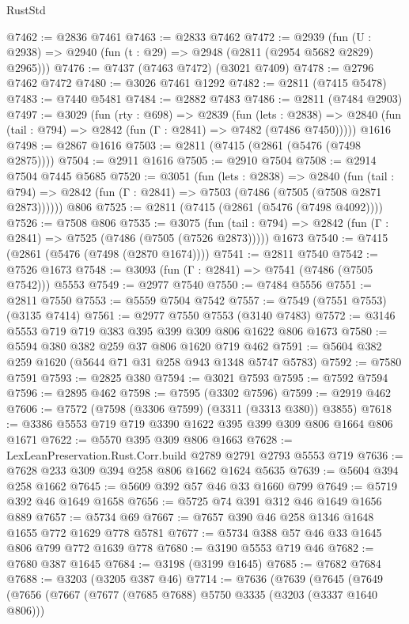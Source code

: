 \begin{lexlean}{RustStd}
\begin{coremodule}
{\begin{coremodule}
{{{{{{{{{{{{{{{@7462 := @2836 @7461
@7463 := @2833 @7462
@7472 := @2939 (fun (U : @2938) => @2940 (fun (t : @29) => @2948 (@2811 (@2954 @5682 @2829) @2965)))
@7476 := @7437 (@7463 @7472) (@3021 @7409)
@7478 := @2796 @7462 @7472
@7480 := @3026 @7461 @1292
@7482 := @2811 (@7415 @5478)
@7483 := @7440 @5481
@7484 := @2882 @7483
@7486 := @2811 (@7484 @2903)
@7497 := @3029
    (fun (rty : @698) =>
    @2839
      (fun (lets : @2838) =>
      @2840 (fun (tail : @794) => @2842 (fun (Γ : @2841) => @7482 (@7486 @7450)))))
    @1616
@7498 := @2867 @1616
@7503 := @2811 (@7415 (@2861 (@5476 (@7498 @2875))))
@7504 := @2911 @1616
@7505 := @2910 @7504
@7508 := @2914 @7504 @7445 @5685
@7520 := @3051
    (fun (lets : @2838) =>
    @2840
      (fun (tail : @794) => @2842 (fun (Γ : @2841) => @7503 (@7486 (@7505 (@7508 @2871 @2873))))))
    @806
@7525 := @2811 (@7415 (@2861 (@5476 (@7498 @4092))))
@7526 := @7508 @806
@7535 := @3075
    (fun (tail : @794) => @2842 (fun (Γ : @2841) => @7525 (@7486 (@7505 (@7526 @2873)))))
    @1673
@7540 := @7415 (@2861 (@5476 (@7498 (@2870 @1674))))
@7541 := @2811 @7540
@7542 := @7526 @1673
@7548 := @3093 (fun (Γ : @2841) => @7541 (@7486 (@7505 @7542))) @5553
@7549 := @2977 @7540
@7550 := @7484 @5556
@7551 := @2811 @7550
@7553 := @5559 @7504 @7542
@7557 := @7549 (@7551 @7553) (@3135 @7414)
@7561 := @2977 @7550 @7553 (@3140 @7483)
@7572 := @3146 @5553 @719 @719 @383 @395 @399 @309 @806 @1622 @806 @1673
@7580 := @5594 @380 @382 @259 @37 @806 @1620 @719 @462
@7591 := @5604 @382 @259 @1620 (@5644 @71 @31 @258 @943 @1348 @5747 @5783)
@7592 := @7580 @7591
@7593 := @2825 @380
@7594 := @3021 @7593
@7595 := @7592 @7594
@7596 := @2895 @462
@7598 := @7595 (@3302 @7596)
@7599 := @2919 @462
@7606 := @7572 (@7598 (@3306 @7599) (@3311 (@3313 @380)) @3855)
@7618 := @3386 @5553 @719 @719 @3390 @1622 @395 @399 @309 @806 @1664 @806 @1671
@7622 := @5570 @395 @309 @806 @1663
@7628 := LexLeanPreservation.Rust.Corr.build @2789 @2791 @2793 @5553 @719
@7636 := @7628 @233 @309 @394 @258 @806 @1662 @1624 @5635
@7639 := @5604 @394 @258 @1662
@7645 := @5609 @392 @57 @46 @33 @1660 @799
@7649 := @5719 @392 @46 @1649 @1658
@7656 := @5725 @74 @391 @312 @46 @1649 @1656 @889
@7657 := @5734 @69
@7667 := @7657 @390 @46 @258 @1346 @1648 @1655 @772 @1629 @778 @5781
@7677 := @5734 @388 @57 @46 @33 @1645 @806 @799 @772 @1639 @778
@7680 := @3190 @5553 @719 @46
@7682 := @7680 @387 @1645
@7684 := @3198 (@3199 @1645)
@7685 := @7682 @7684
@7688 := @3203 (@3205 @387 @46)
@7714 := @7636
    (@7639
      (@7645
        (@7649
          (@7656
            (@7667
              (@7677 (@7685 @7688) @5750 @3335 (@3203 (@3337 @1640 @806)))
}}}}}}}}}}}}}}}
\end{coremodule}}
\end{coremodule}
\end{lexlean}
